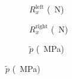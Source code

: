 \begin{figure}[htb!]
  \captionsetup{font=footnotesize}
  \centering
  \begin{subfigure}[b]{0.31\textwidth}
    \caption*{$R_x^\text{left}$ (\SI{}{\newton})}
  \end{subfigure}
  \begin{subfigure}[b]{0.31\textwidth}
    \caption*{$R_x^\text{right}$ (\SI{}{\newton})}
  \end{subfigure}
  \begin{subfigure}[b]{0.31\textwidth}
    \caption*{$\widetilde{p}$ (\SI{}{\mega\pascal})}
  \end{subfigure}
  

\end{figure}
